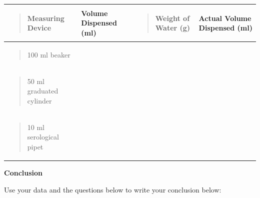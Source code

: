 \documentclass[
  letterpaper,
  DIV=11,
  numbers=noendperiod]{scrreprt}
\newcounter{none} %
\begin{document}
{\def\LTcaptype{none} %
\begin{longtable}[]{@{}
  >{\centering\arraybackslash}p{}
  >{\raggedright\arraybackslash}p{}
  >{\raggedright\arraybackslash}p{}
  >{\raggedright\arraybackslash}p{}@{}}
\toprule\noalign{}
\begin{minipage}[b]{\linewidth}\centering
\begin{quote}
\textbf{Measuring Device}
\end{quote}
\end{minipage} & \begin{minipage}[b]{\linewidth}\raggedright
\textbf{Volume Dispensed (ml)}
\end{minipage} & \begin{minipage}[b]{\linewidth}\raggedright
\begin{quote}
\textbf{Weight of Water (g)}
\end{quote}
\end{minipage} & \begin{minipage}[b]{\linewidth}\raggedright
\textbf{Actual Volume Dispensed (ml)}
\end{minipage} \\
\midrule\noalign{}
\endhead
\bottomrule\noalign{}
\endlastfoot
\begin{minipage}[t]{\linewidth}\centering
\begin{quote}
100 ml beaker
\end{quote}
\end{minipage} & & & \\
\begin{minipage}[t]{\linewidth}\centering
\begin{quote}
50 ml graduated cylinder
\end{quote}
\end{minipage} & & & \\
\begin{minipage}[t]{\linewidth}\centering
\begin{quote}
10 ml serological pipet
\end{quote}
\end{minipage} & & & \\
\end{longtable}
}

\textbf{Conclusion}

Use your data and the questions below to write your conclusion below:
\end{document}
